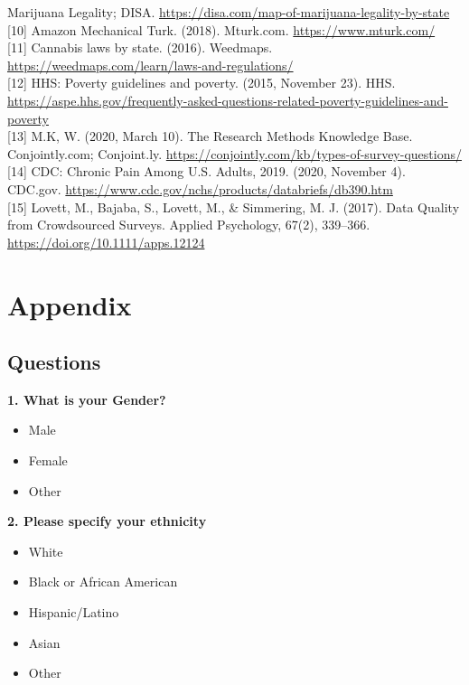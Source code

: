 \documentclass[
]{article}
\providecommand{\tightlist}{%
  \setlength{\itemsep}{0pt}\setlength{\parskip}{0pt}}
\begin{document}
Marijuana Legality; DISA.
\url{https://disa.com/map-of-marijuana-legality-by-state}\\
{[}10{]} Amazon Mechanical Turk. (2018). Mturk.com.
\url{https://www.mturk.com/}\\
{[}11{]} Cannabis laws by state. (2016). Weedmaps.
\url{https://weedmaps.com/learn/laws-and-regulations/}\\
{[}12{]} HHS: Poverty guidelines and poverty. (2015, November 23). HHS.
\url{https://aspe.hhs.gov/frequently-asked-questions-related-poverty-guidelines-and-poverty}\\
{[}13{]} M.K, W. (2020, March 10). The Research Methods Knowledge Base.
Conjointly.com; Conjoint.ly.
\url{https://conjointly.com/kb/types-of-survey-questions/}\\
{[}14{]} CDC: Chronic Pain Among U.S. Adults, 2019. (2020, November 4).
CDC.gov. \url{https://www.cdc.gov/nchs/products/databriefs/db390.htm}\\
{[}15{]} Lovett, M., Bajaba, S., Lovett, M., \& Simmering, M. J. (2017).
Data Quality from Crowdsourced Surveys. Applied Psychology, 67(2),
339--366. \url{https://doi.org/10.1111/apps.12124}

\hypertarget{appendix}{%
\section{Appendix}\label{appendix}}

\hypertarget{questions}{%
\subsection{Questions}\label{questions}}

\textbf{1. What is your Gender?}

\begin{itemize}
\tightlist
\item
  Male
\item
  Female
\item
  Other
\end{itemize}

\textbf{2. Please specify your ethnicity}

\begin{itemize}
\tightlist
\item
  White
\item
  Black or African American
\item
  Hispanic/Latino
\item
  Asian
\item
  Other
\end{itemize}
\end{document}
